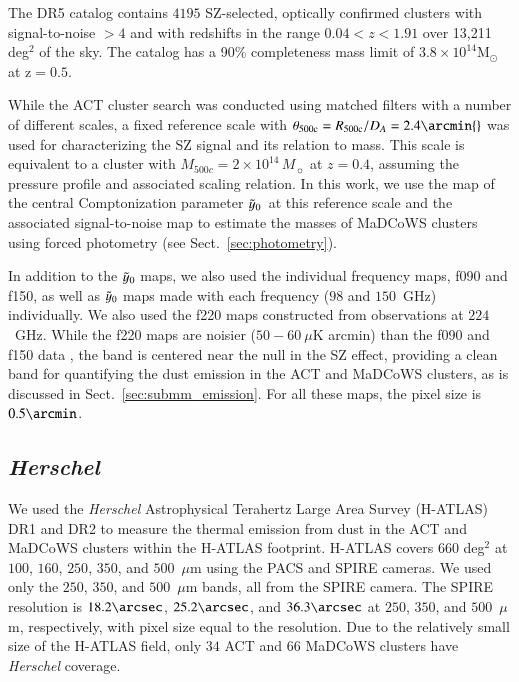 \documentclass[longauth]{aa} %
\newcommand{\yc}{$\Tilde{\vary}_0$\xspace}
\begin{document}
The DR5 catalog contains $4195$ SZ-selected, optically confirmed clusters with signal-to-noise $> 4$ and with redshifts in the range $0.04 < z < 1.91$ over 13,211\,deg$^2$ of the sky. The catalog has a 90\% completeness mass limit of $3.8 \times 10^{14} \text{M}_{\odot}$ at $\text{z} = 0.5$.

While the ACT cluster search was conducted using matched filters with a number of different scales, a fixed reference scale with $\theta_{\rm 500c} = R_{\rm 500c} / D_A = 2.4\arcmin{}$ was used for characterizing the SZ signal and its relation to mass. This scale is equivalent to a cluster with $M_{500c} = 2 \times 10^{14}$\,$M_{\sun}$ at $z = 0.4$, assuming the \citet{Arnaud2010} pressure profile and associated scaling relation. In this work, we use the map of the central Comptonization parameter \yc\ at this reference scale  and the associated signal-to-noise map to estimate the masses of MaDCoWS clusters using forced photometry (see Sect.~\ref{sec:photometry}).

In addition to the \yc maps, we also used the individual frequency maps, f090 and f150, as well as \yc maps made with each frequency ($98$ and $150$~GHz) individually. We also used the f220 maps constructed from  observations at $224$~GHz. While the f220 maps are noisier ($50-60~\mu$K arcmin) than the f090 and f150 data  \citep[ $\lesssim 30~\mu$K arcmin typical; see][]{Naess2020}, the band is centered near the null in the SZ effect, providing a clean band for quantifying the dust emission in the ACT and MaDCoWS clusters, as is discussed in Sect.~\ref{sec:submm_emission}. For all these maps, the pixel size is $0.5\arcmin$.

\subsection{{\it Herschel}}\label{sec:data:herschel}
We used the {\it Herschel} Astrophysical Terahertz Large Area Survey (H-ATLAS) DR1 \citep{Valiante_2016} and DR2 \citep{Smith_2017} to measure the thermal emission from dust in the ACT and MaDCoWS clusters within the H-ATLAS footprint. H-ATLAS covers 660 deg$^2$ at $100$, $160$, $250$, $350$, and $500$~$\mu$m using the PACS and SPIRE cameras. We used only the $250$, $350$, and $500$~$\mu$m bands, all from the SPIRE camera. The SPIRE resolution is $18.2\arcsec$, $25.2\arcsec$, and $36.3\arcsec$ at $250$, $350$, and $500$~$\mu$m, respectively, with pixel size equal to the resolution. Due to the relatively small size of the H-ATLAS field, only $34$ ACT and $66$ MaDCoWS clusters have {\it Herschel} coverage. 
\end{document}

